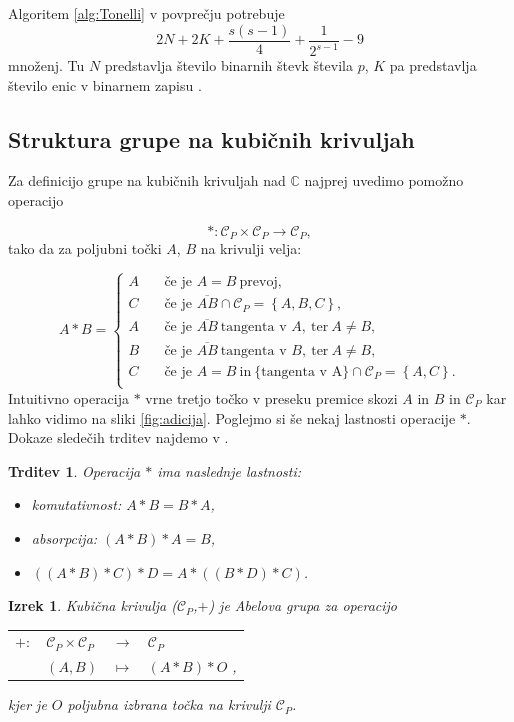 \documentclass[12pt,a4paper,twoside]{article}
\theoremstyle{definition} %
\theoremstyle{plain} %
\newtheorem{izrek}[definicija]{Izrek}
\newtheorem{trditev}[definicija]{Trditev}
\numberwithin{equation}{section}  %
\renewcommand{\C}{\mathbb C}
\begin{document}
Algoritem \ref{alg:Tonelli} v povprečju potrebuje
$$2N+2K+\frac{s(s-1)}{4}+\frac{1}{2^{s-1}}-9$$
množenj. Tu $N$ predstavlja število binarnih števk števila $p$, $K$ pa predstavlja število enic v binarnem zapisu \cite{Tornaria2002}.

\subsection{Struktura grupe na kubičnih krivuljah}


Za definicijo grupe na kubičnih krivuljah nad $\C$ najprej uvedimo pomožno operacijo

$$\ast : \mathcal{C}_P \times \mathcal{C}_P \rightarrow \mathcal{C}_P,$$
tako da za poljubni točki $A$, $B$ na krivulji velja:

\[ A \ast B =
\begin{cases}
A & \quad \text{če je } A=B \ \text{prevoj},\\
C & \quad \text{če je } \overline{AB} \cap \mathcal{C}_P = \left\{ A,B,C \right\},\\
A & \quad \text{če je } \overline{AB} \ \text{tangenta v } A,\ \text{ter} \ A \neq B,\\
B & \quad \text{če je } \overline{AB} \ \text{tangenta v } B,\ \text{ter} \ A \neq B,\\
C &\quad \text{če je } A=B \  \text{in}\ \{\text{tangenta v A}\} \cap \mathcal{C}_P = \left\{ A,C \right\}.\\
\end{cases}
\]
Intuitivno operacija $\ast$ vrne tretjo točko v preseku premice skozi $A$ in $B$ in $\mathcal{C}_P$ kar lahko vidimo na sliki \ref{fig:adicija}. Poglejmo si še nekaj lastnosti operacije $\ast$. Dokaze sledečih trditev najdemo v \cite[Poglavje 17.3]{Gibson1999}.

\begin{trditev}
\label{last zvezda}
Operacija $\ast$ ima naslednje lastnosti:

\begin{itemize}
\item komutativnost: $ A \ast B = B \ast A$,
\item absorpcija: $(A \ast B ) \ast A = B$,
\item $((A \ast B) \ast C ) \ast D = A \ast ((B \ast D)\ast C)$.
\end{itemize}
\end{trditev}

\begin{izrek}
Kubična krivulja ($\mathcal{C}_P$,$+$) je Abelova grupa za operacijo

\begin{table}[ht]
\centering
\begin{tabular}{llll}
$+:$ & $\mathcal{C}_P \times \mathcal{C}_P$ & $\rightarrow$ & $\mathcal{C}_P$ \\
& $(A,B)$ & $\mapsto$ & $(A\ast B)\ast O$ ,
\end{tabular}
\end{table}
kjer je $O$ poljubna izbrana točka na krivulji $ \mathcal{C}_P$.
\end{izrek}
\end{document}
